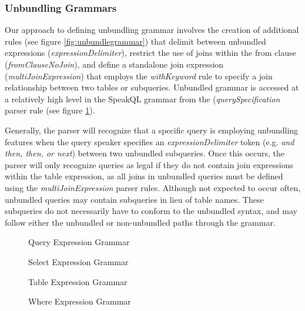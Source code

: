 \subsubsection{Unbundling Grammars}

Our approach to defining unbundling grammar involves the creation of additional rules (see figure \ref{fig:unbundlegrammar}) that delimit between unbundled expressions (\emph{expressionDelimiter}), restrict the use of joins within the from clause (\emph{fromClauseNoJoin}), and define a standalone join expression (\emph{multiJoinExpression}) that employs the \emph{withKeyword} rule to specify a join relationship between two tables or subqueries. Unbundled grammar is accessed at a relatively high level in the SpeakQL grammar from the (\emph{querySpecification} parser rule (see figure \ref{fig:queryexprgrammar}). 

Generally, the parser will recognize that a specific query is employing unbundling features when the query speaker specifies an \emph{expressionDelimiter} token (e.g. \emph{and then, then, or next}) between two unbundled subqueries. Once this occurs, the parser will only recognize queries as legal if they do not contain join expressions within the table expression, as all joins in unbundled queries must be defined using the \emph{multiJoinExpression} parser rules. Although not expected to occur often, unbundled queries may contain subqueries in lieu of table names. These subqueries do not necessarily have to conform to the unbundled syntax, and may follow either the unbundled or non-unbundled paths through the grammar.

\begin{figure}
  \selectStatementTable
  \caption{Query Expression Grammar}
  \label{fig:queryexprgrammar}
\end{figure}

\begin{figure}
  \selectExpressionTable
  \caption{Select Expression Grammar}
  \label{fig:selectexprgrammar}
\end{figure}

\begin{figure}
  \tableExpressionTable
  \caption{Table Expression Grammar}
  \label{fig:tableexprgrammar}
\end{figure}

\begin{figure}
  \whereExpressionTable
  \caption{Where Expression Grammar}
  \label{fig:whereexprgrammar}
\end{figure}

